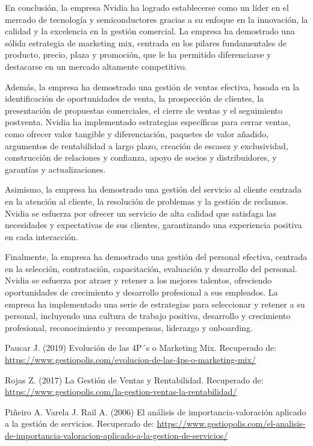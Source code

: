 \documentclass{article}
\begin{document}
En conclusión, la empresa Nvidia ha logrado establecerse como un líder en el mercado de tecnología y semiconductores gracias a su enfoque en la innovación, la calidad y la excelencia en la gestión comercial. La empresa ha demostrado una sólida estrategia de marketing mix, centrada en los pilares fundamentales de producto, precio, plaza y promoción, que le ha permitido diferenciarse y destacarse en un mercado altamente competitivo.

Además, la empresa ha demostrado una gestión de ventas efectiva, basada en la identificación de oportunidades de venta, la prospección de clientes, la presentación de propuestas comerciales, el cierre de ventas y el seguimiento postventa. Nvidia ha implementado estrategias específicas para cerrar ventas, como ofrecer valor tangible y diferenciación, paquetes de valor añadido, argumentos de rentabilidad a largo plazo, creación de escasez y exclusividad, construcción de relaciones y confianza, apoyo de socios y distribuidores, y garantías y actualizaciones.

Asimismo, la empresa ha demostrado una gestión del servicio al cliente centrada en la atención al cliente, la resolución de problemas y la gestión de reclamos. Nvidia se esfuerza por ofrecer un servicio de alta calidad que satisfaga las necesidades y expectativas de sus clientes, garantizando una experiencia positiva en cada interacción.

Finalmente, la empresa ha demostrado una gestión del personal efectiva, centrada en la selección, contratación, capacitación, evaluación y desarrollo del personal. Nvidia se esfuerza por atraer y retener a los mejores talentos, ofreciendo oportunidades de crecimiento y desarrollo profesional a sus empleados. La empresa ha implementado una serie de estrategias para seleccionar y retener a su personal, incluyendo una cultura de trabajo positiva, desarrollo y crecimiento profesional, reconocimiento y recompensas, liderazgo y onboarding.

\newpage

\begin{thebibliography}{9}

  Paucar J. (2019) Evolución de las 4P´s o Marketing Mix. Recuperado de: \url{https://www.gestiopolis.com/evolucion-de-las-4ps-o-marketing-mix/}

  Rojas Z. (2017) La Gestión de Ventas y Rentabilidad. Recuperado de: \url{https://www.gestiopolis.com/la-gestion-ventas-la-rentabilidad/}

  Piñeiro A. Varela J. Rail A. (2006) El análisis de importancia-valoración aplicado a la gestión de servicios. Recuperado de: \url{https://www.gestiopolis.com/el-analisis-de-importancia-valoracion-aplicado-a-la-gestion-de-servicios/}

\end{thebibliography}

  
\end{document}
